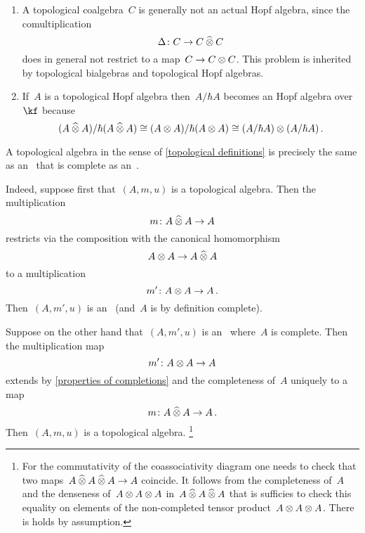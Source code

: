 \documentclass[a4paper, 11pt, oneside]{scrartcl}
\begin{document}
\begin{remark}
  \leavevmode
  \begin{enumerate}
    \item
      A topological coalgebra~$C$ is generally not an actual Hopf algebra, since the comultiplication
      \[
        \Delta
        \colon
        C
        \to
        C \mathbin{\widehat{\otimes}} C
      \]
      does in general not restrict to a map~$C \to C \otimes C$.
      This problem is inherited by topological bialgebras and topological Hopf algebras.
    \item
      If~$A$ is a topological Hopf algebra then~$A / \hbar A$ becomes an Hopf algebra over~$\kf$ because
      \[
        (A \mathbin{\widehat{\otimes}} A) / \hbar (A \mathbin{\widehat{\otimes}} A)
        \cong
        (A \otimes A) / \hbar (A \otimes A)
        \cong
        (A / \hbar A) \otimes (A / \hbar A) \,.
      \]
  \end{enumerate}
\end{remark}

\begin{remark}
  A topological algebra in the sense of \cref{topological definitions} is precisely the same as an~\algebra{$\kfhbar$} that is complete as an~\module{$\kfhbar$}.

  Indeed, suppose first that~$(A, m, u)$ is a topological algebra.
  Then the multiplication
  \[
    m \colon A \mathbin{\widehat{\otimes}} A \to A
  \]
  restricts via the composition with the canonical homomorphism
  \[
    A \otimes A
    \to
    A \mathbin{\widehat{\otimes}} A
  \]
  to a multiplication
  \[
    m'
    \colon
    A \otimes A
    \to
    A \,.
  \]
  Then~$(A, m', u)$ is an~\algebra{$\kfhbar$} (and~$A$ is by definition complete).

  Suppose on the other hand that~$(A, m', u)$ is an~\algebra{$\kfhbar$} where~$A$ is complete.
  Then the multiplication map
  \[
    m'
    \colon
    A \otimes A
    \to
    A
  \]
  extends by \cref{properties of completions} and the completeness of~$A$ uniquely to a~\linear{$\kfhbar$} map
  \[
    m
    \colon
    A \mathbin{\widehat{\otimes}} A
    \to
    A \,.
  \]
  Then~$(A, m, u)$ is a topological algebra.%
  \footnote{
    For the commutativity of the coassociativity diagram one needs to check that two maps~$A \mathbin{\widehat{\otimes}} A \mathbin{\widehat{\otimes}} A \to A$ coincide.
    It follows from the completeness of~$A$ and the denseness of~$A \otimes A \otimes A$ in~$A \mathbin{\widehat{\otimes}} A \mathbin{\widehat{\otimes}} A$ that is sufficies to check this equality on elements of the non-completed tensor product~$A \otimes A \otimes A$.
    There is holds by assumption.
  }
\end{remark}
\end{document}
